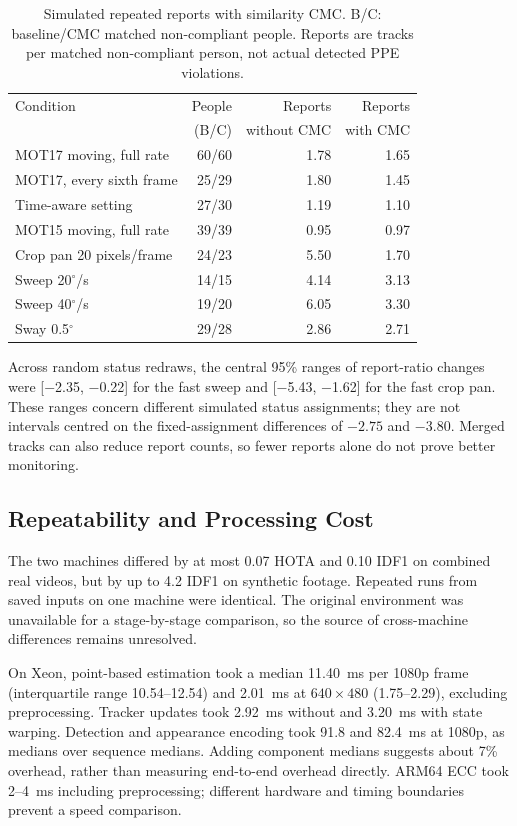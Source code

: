 \documentclass[conference]{IEEEtran}
\begin{document}
\begin{table}[t]
\caption{Simulated repeated reports with similarity CMC. B/C: baseline/CMC matched non-compliant people. Reports are tracks per matched non-compliant person, not actual detected PPE violations.}
\label{tab:ppe}
\centering\footnotesize\setlength{\tabcolsep}{6pt}
\begin{tabular}{@{}lrrr@{}}
\toprule
Condition & People & Reports & Reports\\
 & (B/C) & without CMC & with CMC\\
\midrule
MOT17 moving, full rate & 60/60 & 1.78 & 1.65\\
MOT17, every sixth frame & 25/29 & 1.80 & 1.45\\
\quad Time-aware setting & 27/30 & 1.19 & 1.10\\
MOT15 moving, full rate & 39/39 & 0.95 & 0.97\\
Crop pan 20 pixels/frame & 24/23 & 5.50 & 1.70\\
Sweep 20$^\circ$/s & 14/15 & 4.14 & 3.13\\
Sweep 40$^\circ$/s & 19/20 & 6.05 & 3.30\\
Sway 0.5$^\circ$ & 29/28 & 2.86 & 2.71\\
\bottomrule
\end{tabular}
\end{table}

Across random status redraws, the central 95\% ranges of report-ratio changes were [$-$2.35, $-$0.22] for the fast sweep and [$-$5.43, $-$1.62] for the fast crop pan. These ranges concern different simulated status assignments; they are not intervals centred on the fixed-assignment differences of $-2.75$ and $-3.80$. Merged tracks can also reduce report counts, so fewer reports alone do not prove better monitoring.

\subsection{Repeatability and Processing Cost}
The two machines differed by at most 0.07 HOTA and 0.10 IDF1 on combined real videos, but by up to 4.2 IDF1 on synthetic footage. Repeated runs from saved inputs on one machine were identical. The original environment was unavailable for a stage-by-stage comparison, so the source of cross-machine differences remains unresolved.

On Xeon, point-based estimation took a median 11.40~ms per 1080p frame (interquartile range 10.54--12.54) and 2.01~ms at $640\times480$ (1.75--2.29), excluding preprocessing. Tracker updates took 2.92~ms without and 3.20~ms with state warping. Detection and appearance encoding took 91.8 and 82.4~ms at 1080p, as medians over sequence medians. Adding component medians suggests about 7\% overhead, rather than measuring end-to-end overhead directly. ARM64 ECC took 2--4~ms including preprocessing; different hardware and timing boundaries prevent a speed comparison.
\end{document}
